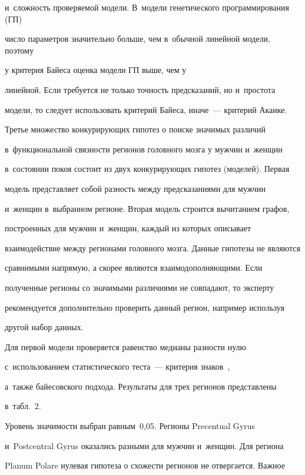 и~сложность проверяемой модели. В~модели генетического программирования (ГП)

число параметров значительно больше, чем в~обычной линейной модели, поэтому 

у критерия Байеса оценка модели ГП выше, чем у 

линейной. Если требуется не только точность предсказаний, но и~простота 

модели, то следует использовать критерий Байеса, иначе~--- критерий Акаике.

     

     Третье множество конкурирующих гипотез о поиске значимых различий 

     в~функциональной связности регионов головного мозга у мужчин и~женщин 

     в~состоянии покоя состоит из двух конкурирующих гипотез (моделей). Первая 

модель представляет собой разность между предсказаниями для мужчин 

и~женщин в~выбранном регионе. Вторая модель строится вычитанием графов, 

построенных для мужчин и~женщин, каждый из которых описывает 

взаимодействие между регионами головного мозга. Данные гипотезы не являются 

сравнимыми напрямую, а скорее являются взаимодополняющими. Если 

полученные регионы со значимыми различиями не совпадают, то эксперту 

рекомендуется дополнительно проверить данный регион, например используя 

другой набор данных.

     

     Для первой модели проверяется равенство медианы разности нулю 

с~использованием статистического теста~--- критерия знаков~\cite{16-tir}, 

а~также байесовского подхода. Результаты для трех регионов представлены 

в~табл.~2.

     

     Уровень значимости выбран равным~0,05. Регионы Precentual Gyrus 

и~Postcentral Gyrus оказались разными для мужчин и~женщин. Для региона 

Planum Polare нулевая гипотеза о схожести регионов не отвергается. Важное 


